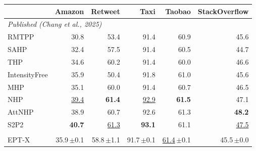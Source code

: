 \begin{tabular}{lrrrrr}
\toprule
& Amazon & Retweet & Taxi & Taobao & StackOverflow \\
\midrule
\multicolumn{6}{l}{\textit{Published (Chang et al., 2025)}} \\[1pt]
\quad RMTPP & 30.8 & 53.4 & 91.4 & 60.9 & 45.6 \\
\quad SAHP & 32.4 & 57.5 & 91.4 & 60.5 & 44.7 \\
\quad THP & 34.6 & 60.2 & 91.4 & 60.0 & 46.6 \\
\quad IntensityFree & 35.9 & 50.4 & 91.8 & 61.0 & 45.6 \\
\quad MHP & 35.1 & 60.0 & 91.4 & 60.7 & 46.5 \\
\quad NHP & \underline{39.4} & \textbf{61.4} & \underline{92.9} & \textbf{61.5} & 47.1 \\
\quad AttNHP & 38.9 & 60.7 & 92.6 & 61.3 & \textbf{48.2} \\
\quad S2P2 & \textbf{40.7} & \underline{61.3} & \textbf{93.1} & 61.1 & \underline{47.5} \\
\addlinespace[3pt]\multicolumn{6}{l}{\textit{Ours}} \\[1pt]
\rowcolor{oursbg} \quad EPT-X & 35.9{\scriptsize\,$\pm$0.1} & 58.8{\scriptsize\,$\pm$1.1} & 91.7{\scriptsize\,$\pm$0.1} & \underline{61.4}{\scriptsize\,$\pm$0.1} & 45.5{\scriptsize\,$\pm$0.0} \\
\bottomrule
\end{tabular}